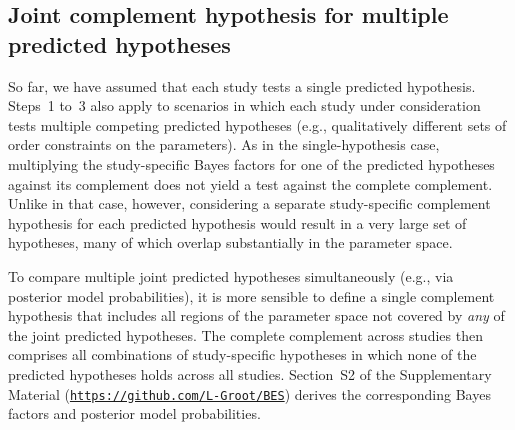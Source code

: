 \documentclass[letterpaper,11pt,oneside]{article}
\newcommand{\suppurl}{\href{https://github.com/L-Groot/BES}{\nolinkurl{https://github.com/L-Groot/BES}}}
\begin{document}
\subsection{Joint complement hypothesis for multiple predicted hypotheses}

So far, we have assumed that each study tests a single predicted hypothesis. Steps~1 to~3 also apply to scenarios in which each study under consideration tests multiple competing predicted hypotheses (e.g., qualitatively different sets of order constraints on the parameters). As in the single-hypothesis case, multiplying the study-specific Bayes factors for one of the predicted hypotheses against its complement does not yield a test against the complete complement. Unlike in that case, however, considering a separate study-specific complement hypothesis for each predicted hypothesis would result in a very large set of hypotheses, many of which overlap substantially in the parameter space. 

To compare multiple joint predicted hypotheses simultaneously (e.g., via posterior model probabilities), it is more sensible to define a single complement hypothesis that includes all regions of the parameter space not covered by \textit{any} of the joint predicted hypotheses. The complete complement across studies then comprises all combinations of study-specific hypotheses in which none of the predicted hypotheses holds across all studies. Section~S2 of the Supplementary Material (\suppurl) derives the corresponding Bayes factors and posterior model probabilities.

\end{document}
